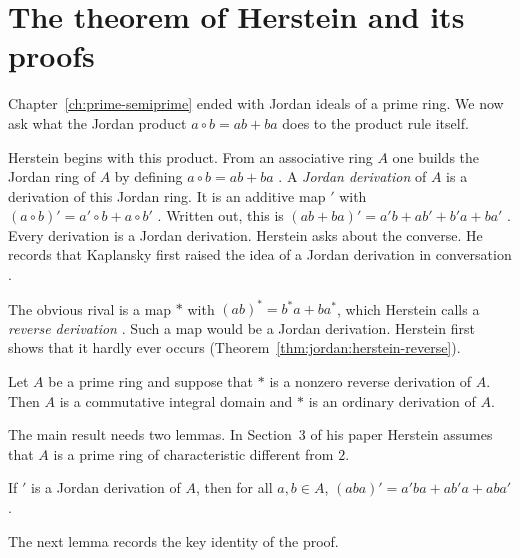 \section{The theorem of Herstein and its proofs}\label{sec:jordan-type:herstein-theorem}

Chapter~\ref{ch:prime-semiprime} ended with Jordan ideals of a prime ring. We now
ask what the Jordan product $a\circ b=ab+ba$ does to the product rule itself.

Herstein begins with this product. From an associative ring $A$ one builds the
Jordan ring of $A$ by defining $a\circ b=ab+ba$ \cite[p.~1104]{Herstein1957}.
A \emph{Jordan derivation} of $A$ is a derivation of this Jordan ring. It is an additive map $'$
with $(a\circ b)'=a'\circ b+a\circ b'$ \cite[p.~1104]{Herstein1957}. Written out, this
is $(ab+ba)'=a'b+ab'+b'a+ba'$ \cite[p.~1104]{Herstein1957}. Every derivation is a
Jordan derivation. Herstein asks about the converse. He records that
Kaplansky first raised the idea of a Jordan derivation in conversation
\cite[p.~1104, footnote]{Herstein1957}.

The obvious rival is a map $*$ with $(ab)^*=b^*a+ba^*$, which Herstein calls a
\emph{reverse derivation} \cite[pp.~1104--1105]{Herstein1957}. Such a map would
be a Jordan derivation. Herstein first shows that it hardly ever occurs (Theorem~\ref{thm:jordan:herstein-reverse}).

\begin{theorem}\label{thm:jordan:herstein-reverse}
Let $A$ be a prime ring and suppose that $*$ is a nonzero reverse derivation of $A$.
Then $A$ is a commutative integral domain and $*$ is an ordinary derivation of $A$.
\end{theorem}

The main result needs two lemmas. In Section~3 of his paper Herstein assumes that $A$
is a prime ring of characteristic different from $2$.

\begin{lemma}\label{lem:jordan:herstein-aba}
If $'$ is a Jordan derivation of $A$, then for all $a,b\in A$,
$(aba)'=a'ba+ab'a+aba'$.
\end{lemma}

The next lemma records the key identity of the proof.

